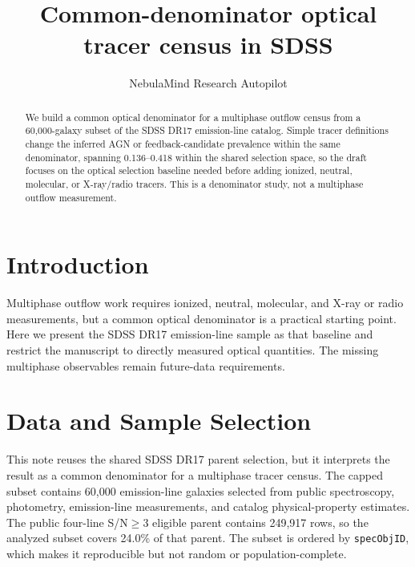 \documentclass[twocolumn]{aastex631}
\begin{document}
\title{Common-denominator optical tracer census in SDSS}
\author{NebulaMind Research Autopilot}

\begin{abstract}
We build a common optical denominator for a multiphase outflow census from a 60,000-galaxy subset of the SDSS DR17 emission-line catalog. Simple tracer definitions change the inferred AGN or feedback-candidate prevalence within the same denominator, spanning 0.136--0.418 within the shared selection space, so the draft focuses on the optical selection baseline needed before adding ionized, neutral, molecular, or X-ray/radio tracers. This is a denominator study, not a multiphase outflow measurement.
\end{abstract}


\section{Introduction}\label{sec:purpose}
Multiphase outflow work requires ionized, neutral, molecular, and X-ray or radio measurements, but a common optical denominator is a practical starting point. Here we present the SDSS DR17 emission-line sample as that baseline and restrict the manuscript to directly measured optical quantities. The missing multiphase observables remain future-data requirements.


\section{Data and Sample Selection}\label{sec:shared-selection}
This note reuses the shared SDSS DR17 parent selection, but it interprets the result as a common denominator for a multiphase tracer census. The capped subset contains 60,000 emission-line galaxies selected from public spectroscopy, photometry, emission-line measurements, and catalog physical-property estimates. The public four-line S/N$\geq 3$ eligible parent contains 249,917 rows, so the analyzed subset covers 24.0\% of that parent. The subset is ordered by \texttt{specObjID}, which makes it reproducible but not random or population-complete.
\end{document}
